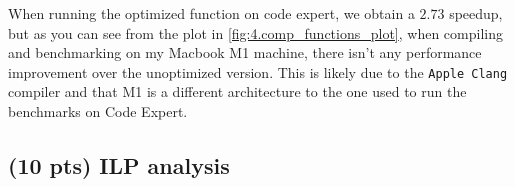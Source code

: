 \documentclass[tikz,14pt,fleqn]{article}
\begin{document}
When running the optimized function on code expert, we obtain a $2.73$ speedup, but as you can see from the plot in \autoref{fig:4.comp_functions_plot}, when compiling and benchmarking on my Macbook M1 machine, there isn't any performance improvement over the unoptimized version. This is likely due to the \texttt{Apple Clang} compiler and that M1 is a different architecture to the one used to run the benchmarks on Code Expert.



\subsection{(10 pts) ILP analysis}
\subsubsection{} %
\begin{figure}
    \centering
    \vspace*{-0.7cm}
    \begin{subfigure}{\linewidth}
        \inputminted[fontsize=\scriptsize, linenos, bgcolor=CODEBG]{C}{../ex5/artcomp.c}
    \end{subfigure}
\end{figure}

\subsubsection{} %








\end{document}
